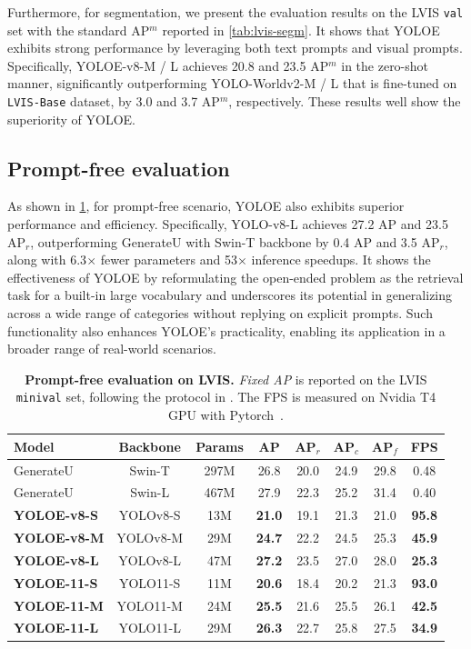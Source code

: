 \documentclass[10pt,twocolumn,letterpaper]{article}
\begin{document}
Furthermore, for segmentation, we present the evaluation results on the LVIS \texttt{val} set with the standard AP$^m$ reported in \cref{tab:lvis-segm}. It shows that YOLOE exhibits strong performance by leveraging both text prompts and visual prompts. Specifically, YOLOE-v8-M / L achieves 20.8 and 23.5 AP$^m$ in the zero-shot manner, significantly outperforming YOLO-Worldv2-M / L that is fine-tuned on \texttt{LVIS-Base} dataset, by 3.0 and 3.7 AP$^m$, respectively. These results well show the superiority of YOLOE.

\subsection{Prompt-free evaluation}
As shown in \cref{tab:lvis-pf}, for prompt-free scenario, YOLOE also exhibits superior performance and efficiency. Specifically, YOLO-v8-L achieves 27.2 AP and 23.5 AP$_r$, outperforming GenerateU with Swin-T backbone by 0.4 AP and 3.5 AP$_r$, along with 6.3$\times$ fewer parameters and 53$\times$ inference speedups. It shows the effectiveness of YOLOE by reformulating the open-ended problem as the retrieval task for a built-in large vocabulary and underscores its potential in generalizing across a wide range of categories without replying on explicit prompts. Such functionality also enhances YOLOE's practicality, enabling its application in a broader range of real-world scenarios.

\begin{table}[t]
\centering
\caption{\textbf{Prompt-free evaluation on LVIS.} \textit{Fixed AP} is reported on the LVIS \texttt{minival} set, following the protocol in \cite{lin2024generateu}. The FPS is measured on Nvidia T4 GPU with Pytorch~\cite{paszke2019pytorch}.}
\label{tab:lvis-pf}
\small
\setlength{\tabcolsep}{2pt}
\begin{tabular}{lccccccc} 
\toprule
Model & Backbone & Params & AP & AP$_r$ & AP$_c$ & AP$_f$ & FPS  \\ 
\midrule
GenerateU~\cite{lin2024generateu} & Swin-T & 297M & 26.8 & 20.0 & 24.9 & 29.8 & 0.48 \\ 
GenerateU~\cite{lin2024generateu} & Swin-L & 467M & 27.9 & 22.3 & 25.2 & 31.4 & 0.40 \\
\midrule
\textbf{YOLOE-v8-S} & YOLOv8-S & 13M & \textbf{21.0} & 19.1 & 21.3 & 21.0 & \textbf{95.8} \\
\textbf{YOLOE-v8-M} & YOLOv8-M & 29M & \textbf{24.7} & 22.2 & 24.5 & 25.3 & \textbf{45.9} \\
\textbf{YOLOE-v8-L} & YOLOv8-L & 47M & \textbf{27.2} & 23.5 & 27.0 & 28.0 & \textbf{25.3}  \\
\textbf{YOLOE-11-S} & YOLO11-S & 11M & \textbf{20.6} & 18.4 & 20.2 & 21.3 & \textbf{93.0} \\
\textbf{YOLOE-11-M} & YOLO11-M & 24M & \textbf{25.5} & 21.6 & 25.5 & 26.1 & \textbf{42.5} \\
\textbf{YOLOE-11-L} & YOLO11-L & 29M & \textbf{26.3} & 22.7 & 25.8 & 27.5 & \textbf{34.9}  \\
\bottomrule
\end{tabular}
\vspace{-10pt}
\end{table}
\end{document}
